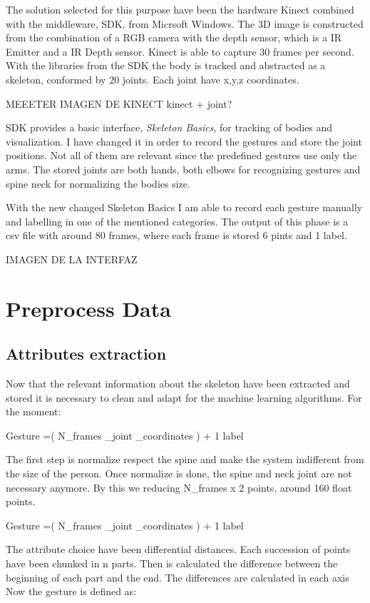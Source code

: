 The solution selected for this purpose have been the hardware Kinect combined with the middleware, SDK, from Micrsoft Windows. The 3D image is constructed from the combination of a RGB camera with the depth sensor, which is a IR Emitter and a IR Depth sensor. Kinect is able to capture 30 frames per second. 
With the libraries from the SDK the body is tracked and abstracted as a skeleton, conformed by 20 joints. Each joint have x,y,z coordinates.

MEEETER IMAGEN DE KINECT kinect + joint?

SDK provides a basic interface, \textit{Skeleton Basics}, for tracking of bodies and visualization. I have changed it in order to record the gestures and store the  joint positions. Not all of them are relevant since the predefined gestures use only the arms. The stored joints are both hands, both elbows for recognizing gestures and spine neck for normalizing the bodies size.

With the new changed Skeleton Basics I am able to record each gesture manually and labelling in one of the mentioned categories. The output of this phase is a csv file with around 80 frames, where each frame is stored 6 pints and 1 label.

IMAGEN DE LA INTERFAZ 

\section{Preprocess Data}

\subsection{Attributes extraction}
Now that the relevant information about the skeleton have been extracted and stored it is necessary to clean and adapt for the machine learning algorithms. For the moment:

Gesture =( N_{frames} _{joint} _{coordinates} ) + 1 label

The first step is normalize respect the spine and make the system indifferent from the size of the person. Once normalize is done, the spine and neck joint are not necessary anymore. By this we reducing N_{frames} x 2 points, around 160 float points.

Gesture =( N_{frames} _{joint} _{coordinates} ) + 1 label

The attribute choice have been differential distances. Each succession of points have been chunked in n parts. Then is calculated the difference between the beginning of each part and the end. The differences are calculated in each axis 
Now the gesture is defined as:


